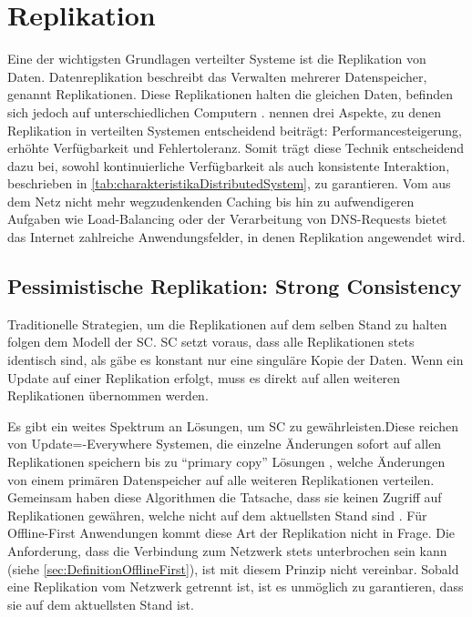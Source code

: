 \documentclass[a4paper, 12pt]{scrreprt}
\begin{document}
\section{Replikation}

Eine der wichtigsten Grundlagen verteilter Systeme ist die Replikation von Daten. Datenreplikation beschreibt das Verwalten mehrerer Datenspeicher, genannt Replikationen. Diese Replikationen halten die gleichen Daten, befinden sich jedoch auf unterschiedlichen Computern \autocite[S.42]{ArticleOptimisticReplication}. \citet{BookDistributedSystemsConceptsAndDesign} nennen drei Aspekte, zu denen Replikation in verteilten Systemen entscheidend beiträgt: Performancesteigerung, erhöhte Verfügbarkeit und Fehlertoleranz. Somit trägt diese Technik entscheidend dazu bei, sowohl kontinuierliche Verfügbarkeit als auch konsistente Interaktion, beschrieben in \ref{tab:charakteristikaDistributedSystem}, zu garantieren. Vom aus dem Netz nicht mehr wegzudenkenden Caching bis hin zu aufwendigeren Aufgaben wie Load-Balancing oder der Verarbeitung von DNS-Requests bietet das Internet zahlreiche Anwendungsfelder, in denen Replikation angewendet wird. 

\subsection{Pessimistische Replikation: Strong Consistency}

Traditionelle Strategien, um die Replikationen auf dem selben Stand zu halten folgen dem Modell der \ac{SC}. \ac{SC} setzt voraus, dass alle Replikationen stets identisch sind, als gäbe es konstant nur eine singuläre Kopie der Daten. Wenn ein Update auf einer Replikation erfolgt, muss es direkt auf allen weiteren Replikationen übernommen werden. 

Es gibt ein weites Spektrum an Lösungen, um \ac{SC} zu gewährleisten.Diese reichen von {Update=-Everywhere} Systemen, die einzelne Änderungen sofort auf allen Replikationen speichern \autocite{ThesisUpdateEverywhere} bis zu \enquote{primary copy} Lösungen \autocite[S.14]{BookPrimaryReplica}, welche Änderungen von einem primären Datenspeicher auf alle weiteren Replikationen verteilen. Gemeinsam haben diese Algorithmen die Tatsache, dass sie keinen Zugriff auf Replikationen gewähren, welche nicht auf dem aktuellsten Stand sind \autocite[S.43]{ArticleOptimisticReplication}. Für Offline-First Anwendungen kommt diese Art der Replikation nicht in Frage. Die Anforderung, dass die Verbindung zum Netzwerk stets unterbrochen sein kann (siehe \ref{sec:DefinitionOfflineFirst}), ist mit diesem Prinzip nicht vereinbar. Sobald eine Replikation vom Netzwerk getrennt ist, ist es unmöglich zu garantieren, dass sie auf dem aktuellsten Stand ist.
\end{document}
